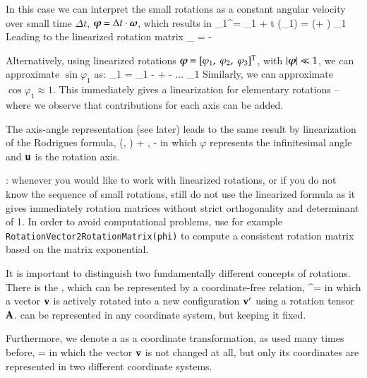 In this case we can interpret the small rotations as a constant angular velocity over small time $\Delta t$, $\mbox{\boldmath $\varphi$ \unboldmath}\!\! = \Delta t \cdot \mbox{\boldmath $\omega$ \unboldmath}\!\!$, which results in
\be
  \rv_1^\prime= \rv_1 + \Delta t \cdot (\tomega \times \rv_1) = (\Im + \tilde \boldVarPhi) \rv_1
\ee
Leading to the linearized rotation matrix
\be
  \Rot_ = \Im - \tilde \boldVarPhi
\ee

Alternatively, using linearized rotations $\mbox{\boldmath $\varphi$ \unboldmath}\!\! = [\varphi_1,\;\varphi_2,\;\varphi_3]^\mathrm{T}$, with $|\mbox{\boldmath $\varphi$ \unboldmath}\!\!| \ll 1$, we can approximate $\sin \varphi_1$ as:
\be
  \sin \varphi_1 = \varphi_1 -  +  - ... \approx \varphi_1
\ee
Similarly, we can approximate $\cos \varphi_1 \approx 1$. This immediately gives a linearization for elementary rotations -- where we observe that contributions for each axis can be added.

The axis-angle representation (see later) leads to the same result by linearization of the Rodrigues formula,
\be
  \Rot(\uv, \varphi) \approx \Im + \tilde \uv \varphi, \quad \Rot\tp \approx \Im - \tilde \uv \varphi
\ee
in which $\varphi$ represents the infinitesimal angle and $\mathbf{u}$ is the rotation axis.

: whenever you would like to work with linearized rotations, or if you do not know the sequence of small rotations, still do not use the linearized formula as it gives immediately rotation matrices without strict orthogonality and determinant of 1. In order to avoid computational problems, use for example \texttt{RotationVector2RotationMatrix(phi)} to compute a consistent rotation matrix based on the matrix exponential.


%
It is important to distinguish two fundamentally different concepts of rotations.
There is the , which can be represented by a coordinate-free relation,
\be \label{eq:theory:rotations:active}
  \vv^\prime = \Rot \vv
\ee
in which a vector $\mathbf{v}$ is actively rotated into a new configuration $\mathbf{v}^\prime$ using a rotation tensor $\mathbf{A}$.
 can be represented in any coordinate system, but keeping it fixed.

Furthermore, we denote a  as a coordinate transformation, as used many times before,
\be
   =  
\ee
in which the vector $\mathbf{v}$ is not changed at all, but only its coordinates are represented in two different coordinate systems.

